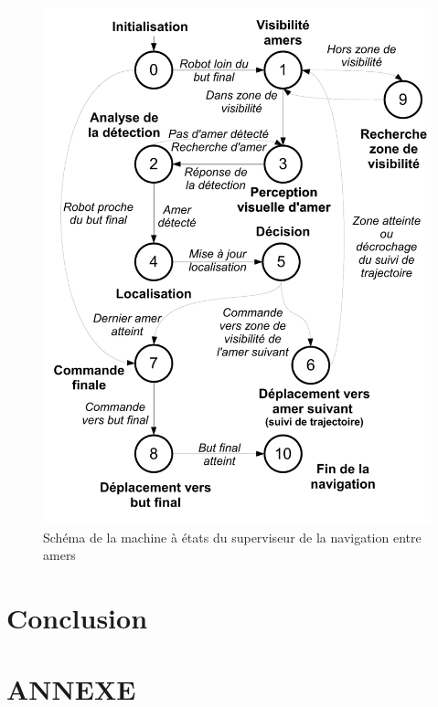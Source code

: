 \documentclass[10pt,a4paper]{article}
\begin{document}
\begin{figure}[!h]
\centering\includegraphics[scale=0.5]{figures/HLC_MEF.pdf}
\caption{Schéma de la machine à états du superviseur de la navigation entre amers}
\label{HLC_MEF}
\end{figure}

\newpage
\section{Conclusion}
\label{sec:conclusion}

\newpage
\listoffigures
\newpage

\section*{ANNEXE}
\end{document}
